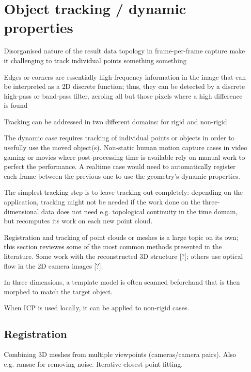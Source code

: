 \section{Object tracking / dynamic properties} \label{sec:tracking}

Disorganised nature of the result data topology in frame-per-frame capture make it challenging to track individual points something something


\cite{bojsen2012tracking}
\cite{li2009robust}

Edges or corners are essentially high-frequency information in the image that can be interpreted as a 2D discrete function; thus, they can be detected by a discrete high-pass or band-pass filter, zeroing all but those pixels where a high difference is found \cite{marr1980theory}


Tracking can be addressed in two different domains: for rigid and non-rigid 

The dynamic case requires tracking of individual points or objects in order to usefully use the moved object(s).
Non-static human motion capture cases in video gaming or movies where post-processing time is available rely on manual work to perfect the performance.
A realtime case would need to automatically register each frame between the previous one to use the geometry's dynamic properties.

The simplest tracking step is to leave tracking out completely: depending on the application, tracking might not be needed if the work done on the three-dimensional data does not need e.g. topological continuity in the time domain, but recomputes its work on each new point cloud.

Registration and tracking of point clouds or meshes is a large topic on its own; this section reviewes some of the most common methods presented in the literature. Some work with the reconstructed 3D structure [?]; others use optical flow in the 2D camera images [?].

In three dimensions, a template model is often scanned beforehand that is then morphed to match the target object.
\cite{bojsen2012tracking,li2009robust}

When ICP is used locally, it can be applied to non-rigid cases. \cite{brown2007global}

\subsection{Registration}

Combining 3D meshes from multiple viewpoints (cameras/camera pairs). Also e.g. ransac for removing noise. Iterative closest point fitting.

